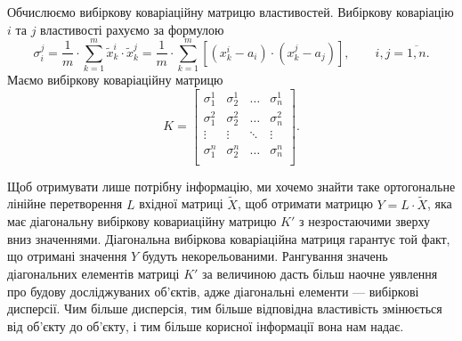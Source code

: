 Обчислюємо вибіркову коваріаційну матрицю властивостей.
Вибіркову коваріацію $i$ та $j$ властивості рахуємо за формулою
\begin{equation*}
  \sigma_i^j
  = \frac{1}{m} \cdot \sum_{k=1}^{m} \tilde{x}_k^i \cdot \tilde{x}_k^j
  = \frac{1}{m} \cdot \sum_{k=1}^{m}
    \left[ \left( x_k^i - a_i \right) \cdot \left( x_k^j - a_j \right) \right],
    \qquad i,j = \overline{1,n}.
\end{equation*}
Маємо вибіркову коваріаційну матрицю
\begin{equation*}
  K = \begin{bmatrix}
    \sigma_1^1 & \sigma_2^1 & \dots  & \sigma_n^1 \\
    \sigma_1^2 & \sigma_2^2 & \dots  & \sigma_n^2 \\
    \vdots     & \vdots     & \ddots & \vdots     \\
    \sigma_1^n & \sigma_2^n & \dots  & \sigma_n^n \\
  \end{bmatrix}.
\end{equation*}
\begin{comment}
\begin{equation*}
  K =
  \begin{bmatrix}
    \frac{1}{m} \cdot \sum_{k=1}^{m} \tilde{x}_k^1 \cdot \tilde{x}_k^1
    &
    \frac{1}{m} \cdot \sum_{k=1}^{m} \tilde{x}_k^1 \cdot \tilde{x}_k^2
    &
    \dots
    &
    \frac{1}{m} \cdot \sum_{k=1}^{m} \tilde{x}_k^1 \cdot \tilde{x}_k^n
    \\
    \frac{1}{m} \cdot \sum_{k=1}^{m} \tilde{x}_k^2 \cdot \tilde{x}_k^1
    &
    \frac{1}{m} \cdot \sum_{k=1}^{m} \tilde{x}_k^2 \cdot \tilde{x}_k^2
    &
    \dots
    &
    \frac{1}{m} \cdot \sum_{k=1}^{m} \tilde{x}_k^2 \cdot \tilde{x}_k^n
    \\
    \vdots & \vdots & \dots & \vdots \\
    \frac{1}{m} \cdot \sum_{k=1}^{m} \tilde{x}_k^n \cdot \tilde{x}_k^1
    &
    \frac{1}{m} \cdot \sum_{k=1}^{m} \tilde{x}_k^n \cdot \tilde{x}_k^2
    &
    \dots
    &
    \frac{1}{m} \cdot \sum_{k=1}^{m} \tilde{x}_k^n \cdot \tilde{x}_k^n
  \end{bmatrix}.
\end{equation*}
\end{comment}

Щоб отримувати лише потрібну інформацію, ми хочемо знайти таке ортогональне
лінійне перетворення $L$ вхідної матриці $\tilde{X}$, щоб отримати матрицю
$Y = L \cdot \tilde{X}$, яка має діагональну вибіркову ковариаційну матрицю $K'$
з незростаючими зверху вниз значеннями.
Діагональна вибіркова коваріаційна матриця гарантує той факт, що отримані
значення $Y$ будуть некорельованими.
Рангування значень діагональних елементів матриці $K'$ за величиною дасть більш
наочне уявлення про будову досліджуваних об’єктів, адже діагональні
елементи --- вибіркові дисперсії.
Чим більше дисперсія, тим більше відповідна властивість змінюється від об’єкту
до об’єкту, і тим більше корисної інформації вона нам надає.

